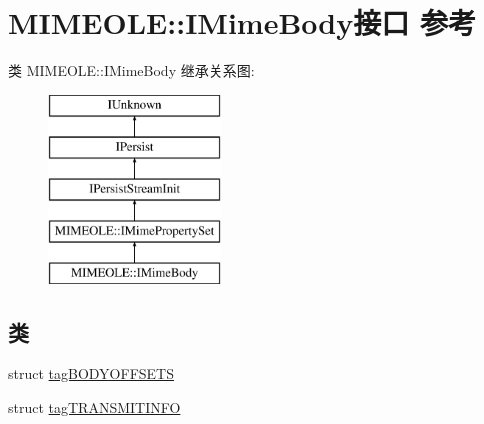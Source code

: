 \hypertarget{interface_m_i_m_e_o_l_e_1_1_i_mime_body}{}\section{M\+I\+M\+E\+O\+LE\+:\+:I\+Mime\+Body接口 参考}
\label{interface_m_i_m_e_o_l_e_1_1_i_mime_body}
类 M\+I\+M\+E\+O\+LE\+:\+:I\+Mime\+Body 继承关系图\+:\begin{figure}[H]
\begin{center}
\leavevmode
\includegraphics[height=5.000000cm]{interface_m_i_m_e_o_l_e_1_1_i_mime_body}
\end{center}
\end{figure}
\subsection*{类}
\begin{DoxyCompactItemize}
\item 
struct \hyperlink{struct_m_i_m_e_o_l_e_1_1_i_mime_body_1_1tag_b_o_d_y_o_f_f_s_e_t_s}{tag\+B\+O\+D\+Y\+O\+F\+F\+S\+E\+TS}
\item 
struct \hyperlink{struct_m_i_m_e_o_l_e_1_1_i_mime_body_1_1tag_t_r_a_n_s_m_i_t_i_n_f_o}{tag\+T\+R\+A\+N\+S\+M\+I\+T\+I\+N\+FO}
\end{DoxyCompactItemize}
